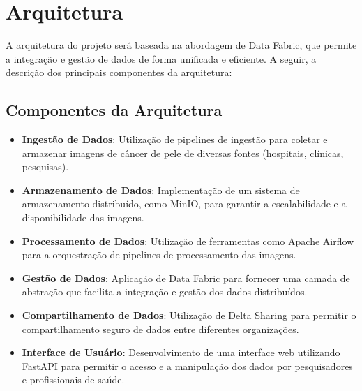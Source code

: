 \section{Arquitetura}

A arquitetura do projeto será baseada na abordagem de Data Fabric, que permite a integração e gestão de dados de forma unificada e eficiente. A seguir, a descrição dos principais componentes da arquitetura:

\subsection{Componentes da Arquitetura}
\begin{itemize}
    \item \textbf{Ingestão de Dados}: Utilização de pipelines de ingestão para coletar e armazenar imagens de câncer de pele de diversas fontes (hospitais, clínicas, pesquisas).
    \item \textbf{Armazenamento de Dados}: Implementação de um sistema de armazenamento distribuído, como MinIO, para garantir a escalabilidade e a disponibilidade das imagens.
    \item \textbf{Processamento de Dados}: Utilização de ferramentas como Apache Airflow para a orquestração de pipelines de processamento das imagens.
    \item \textbf{Gestão de Dados}: Aplicação de Data Fabric para fornecer uma camada de abstração que facilita a integração e gestão dos dados distribuídos.
    \item \textbf{Compartilhamento de Dados}: Utilização de Delta Sharing para permitir o compartilhamento seguro de dados entre diferentes organizações.
    \item \textbf{Interface de Usuário}: Desenvolvimento de uma interface web utilizando FastAPI para permitir o acesso e a manipulação dos dados por pesquisadores e profissionais de saúde.
\end{itemize}

